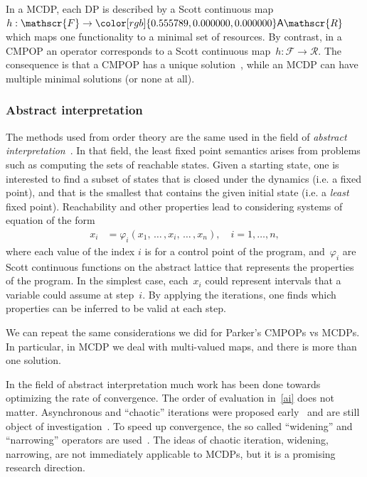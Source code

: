 \documentclass[twocolumn,english]{IEEEtran}
\theoremstyle{definition}
\theoremstyle{plain}
\theoremstyle{definition}
\theoremstyle{remark}
\theoremstyle{definition}
\theoremstyle{plain}
\theoremstyle{plain}
\newcommand{\aword}[1]{\mathsf{#1}}
\newcommand{\vmath}[1]{\aword{#1}}
\newcommand{\antichains}{\vmath{A}}
\newcommand{\ftor}{{h}}
\newcommand{\funsp}{\mathscr{F}}
\newcommand{\ressp}{\mathscr{R}}
\newcommand{\Aressp}{{\antichains\ressp}}
\newcommand{\colR}{\color[rgb]{0.555789,0.000000,0.000000}}
\renewcommand{\Aressp}{{\colR\antichains\ressp}}
\newcommand{\scottcontinuous}{Scott continuous\xspace}
\begin{document}
In a MCDP, each DP is described by a \scottcontinuous map~$\ftor:\funsp\rightarrow\Aressp$
which maps one functionality to a minimal set of resources. By contrast,
in a CMPOP an operator corresponds to a \scottcontinuous map~$\ftor:\funsp\rightarrow\ressp$.
The consequence is that a CMPOP has a unique solution~\cite[Theorem 8]{parkerjr89partial},
while an MCDP can have multiple minimal solutions (or none at all).


\subsubsection*{Abstract interpretation}

The methods used from order theory are the same used in the field
of \emph{abstract interpretation}~\cite{cousot14abstract}. In
that field, the least fixed point semantics arises from problems such
as computing the sets of reachable states. Given a starting state,
one is interested to find a subset of states that is closed under
the dynamics (i.e. a fixed point), and that is the smallest that contains
the given initial state (i.e. a \emph{least} fixed point). Reachability
and other properties lead to considering systems of equation of the
form
\begin{align}
x_{i} & =\varphi_{i}(x_{1},\,\dots\,,x_{i},\,\dots\,,x_{n}),\quad i=1,\dots,n,\label{eq:ai}
\end{align}
where each value of the index $i$ is for a control point of the program,
and~$\varphi_{i}$ are \scottcontinuous functions on the abstract
lattice that represents the properties of the program. In the simplest
case, each~$x_{i}$ could represent intervals that a variable could
assume at step~$i$. By applying the iterations, one finds which
properties can be inferred to be valid at each step.

We can repeat the same considerations we did for Parker's CMPOPs vs
MCDPs. In particular, in MCDP we deal with multi-valued maps, and
there is more than one solution.

In the field of abstract interpretation much work has been done towards
optimizing the rate of convergence. The order of evaluation in~\eqref{ai}
does not matter. Asynchronous and ``chaotic'' iterations were proposed
early~\cite{cousot77asynchronous} and are still object of investigation~\cite{bourdoncleefficient}.
To speed up convergence, the so called ``widening'' and ``narrowing''
operators are used~\cite{cortesi11widening}. The ideas of chaotic
iteration, widening, narrowing, are not immediately applicable to
MCDPs, but it is a promising research direction.
\end{document}
